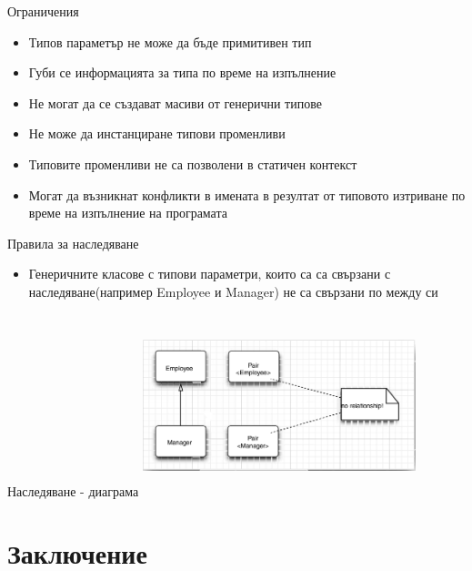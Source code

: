 \documentclass{beamer}
\begin{document}
\begin{frame}{Ограничения}
  \transdissolve
  \begin{itemize}
  \item Типов параметър не може да бъде примитивен тип
  \item Губи се информацията за типа по време на изпълнение
  \item Не могат да се създават масиви от генерични типове
  \item Не може да инстанциране типови променливи
  \item Типовите променливи не са позволени в статичен контекст
  \item Могат да възникнат конфликти в имената в резултат от типовото
    изтриване по време на изпълнение на програмата
  \end{itemize}
\end{frame}

\begin{frame}{Правила за наследяване}
  \transdissolve
  \begin{itemize}
  \item   Генеричните класове с типови
    параметри, които са са свързани с
    наследяване(например Employee и
    Manager) не са свързани по между си
  \end{itemize}
\end{frame}

\begin{frame}{Наследяване - диаграма}
  \transdissolve
  \includegraphics[width=300px,height=200px]{images/relationship.png}
\end{frame}


\section*{Заключение}
\end{document}
